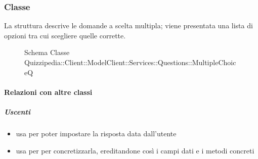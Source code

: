 \subsubsection{Classe }
La struttura descrive le domande a scelta multipla; viene presentata una lista di opzioni tra cui scegliere quelle corrette.
\begin{figure}[H]
\centering
\noindent{}
\caption[Schema Classe MultipleChoiceQ]{Schema Classe Quizzipedia::Client::ModelClient::Services::Questions::MultipleChoiceQ}
\end{figure}
\paragraph{Relazioni con altre classi}
\subparagraph{Uscenti}
\begin{itemize}
\item usa  per poter impostare la risposta data dall'utente
\item usa  per per concretizzarla, ereditandone così i campi dati e i metodi concreti
\end{itemize}
